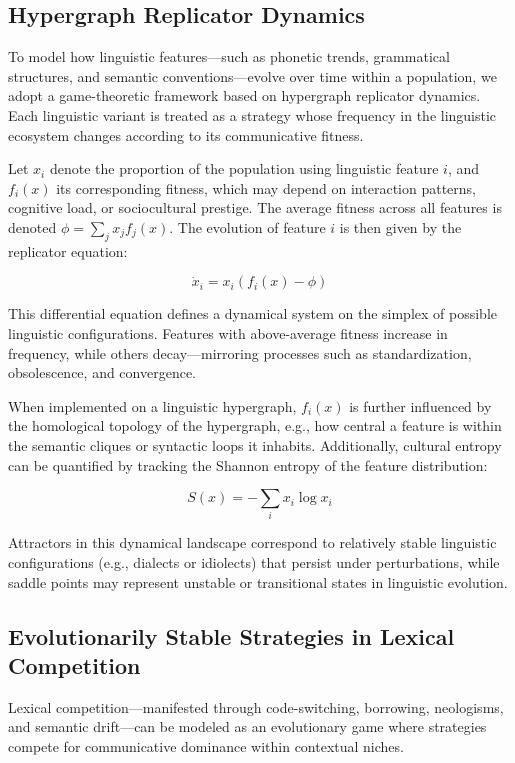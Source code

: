 \documentclass{article}
\theoremstyle{plain}
\theoremstyle{claimstyle}
\begin{document}
\subsection{Hypergraph Replicator Dynamics}

To model how linguistic features—such as phonetic trends, grammatical structures, and semantic conventions—evolve over time within a population, we adopt a game-theoretic framework based on hypergraph replicator dynamics. Each linguistic variant is treated as a strategy whose frequency in the linguistic ecosystem changes according to its communicative fitness.

Let $x_i$ denote the proportion of the population using linguistic feature $i$, and $f_i(x)$ its corresponding fitness, which may depend on interaction patterns, cognitive load, or sociocultural prestige. The average fitness across all features is denoted $\phi = \sum_j x_j f_j(x)$. The evolution of feature $i$ is then given by the replicator equation:

\[
\dot{x}_i = x_i \left(f_i(x) - \phi\right)
\]

This differential equation defines a dynamical system on the simplex of possible linguistic configurations. Features with above-average fitness increase in frequency, while others decay—mirroring processes such as standardization, obsolescence, and convergence.

When implemented on a linguistic hypergraph, $f_i(x)$ is further influenced by the homological topology of the hypergraph, e.g., how central a feature is within the semantic cliques or syntactic loops it inhabits. Additionally, cultural entropy can be quantified by tracking the Shannon entropy of the feature distribution:

\[
S(x) = -\sum_i x_i \log x_i
\]

Attractors in this dynamical landscape correspond to relatively stable linguistic configurations (e.g., dialects or idiolects) that persist under perturbations, while saddle points may represent unstable or transitional states in linguistic evolution.

\subsection{Evolutionarily Stable Strategies in Lexical Competition}

Lexical competition—manifested through code-switching, borrowing, neologisms, and semantic drift—can be modeled as an evolutionary game where strategies compete for communicative dominance within contextual niches.
\end{document}
